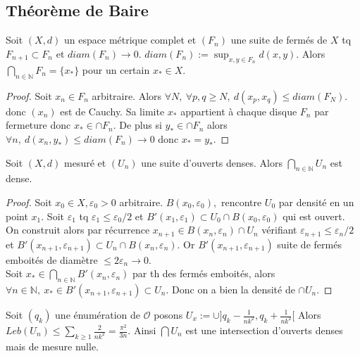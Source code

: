 \subsection{Théorème de Baire}
\begin{lemme} Soit $(X,d)$ un espace métrique complet et $(F_n)$ une suite de fermés de $X$ tq $F_{n+1}\subset F_n$ et $diam(F_n)\to 0.$ $diam(F_n):=\sup_{x,y\in F_n}d(x,y)$. Alors $\bigcap\limits_{n\in \mathbb{N} } F_n=\{x_*\} $ pour un certain $x_*\in X.$
\end{lemme}
\begin{proof}
    Soit $x_{n}\in F_n$ arbitraire. Alors $\forall N,\ \forall p,q\ge N,\ d(x_p,x_q)\le diam(F_N).  $ donc $(x_{n})$ est de Cauchy. Sa limite $x_*$ appartient à chaque disque $F_n$ par fermeture donc $x_*\in \cap F_n.$ De plus si $y_*\in \cap F_n$ alors $\forall n,\ d(x_{n},y_*)\le diam(F_n)\to 0 $ donc $x_*=y_*$.
\end{proof}
\begin{theoreme}[Baire]

    Soit $(X,d)$ mesuré et $(U_n)$ une suite d'ouverts denses. Alors $\bigcap\limits_{n\in \mathbb{N} } U_n$ est dense.
\end{theoreme}
\begin{proof}
    Soit $x_0\in X, \varepsilon _0 >0$ arbitraire. $B(x_0,\varepsilon _0),$ rencontre $U_0$ par densité en un point $x_1.$ Soit $\varepsilon _1$ tq $\varepsilon _1\le \varepsilon _0 /2$ et $B'(x_1,\varepsilon _1)\subset U_0\cap B(x_0,\varepsilon _0)$ qui est ouvert.\\
    On construit alors par récurrence $x_{n+1}\in B(x_n,\varepsilon _n)\cap U_n$ vérifiant $\varepsilon _{n+1}\le \varepsilon _n /2$ et $B'(x_{n+1},\varepsilon _{n+1})\subset U_n\cap B(x_{n},\varepsilon _n)$. Or $B'(x_{n+1},\varepsilon _{n+1})$ suite de fermés emboités de diamètre $\le 2\varepsilon _n\to 0$.\\
    Soit $x_*\in \bigcap\limits_{n\in \mathbb{N} } B'(x_n,\varepsilon _n)$ par th des fermés emboités, alors $\forall n\in \mathbb{N} ,\ x_*\in B'(x_{n+1},\varepsilon _{n+1})\subset U_n $. Donc on a bien la densité de $\cap U_n$.
\end{proof}
\begin{ex}
    Soit $(q_k)$ une énumération de $\mathcal{O}$ posons $U_x:=\cup ]q_k-\frac{1}{nk^2},q_k+\frac{1}{nk^2}[$ Alors $Leb(U_n)\le \sum\limits_{k\ge 1}^{} \frac{2}{nk^2}=\frac{\pi^2}{3n}$. Ainsi $\bigcap U_n$ est une intersection d'ouverts denses mais de mesure nulle.
\end{ex}

